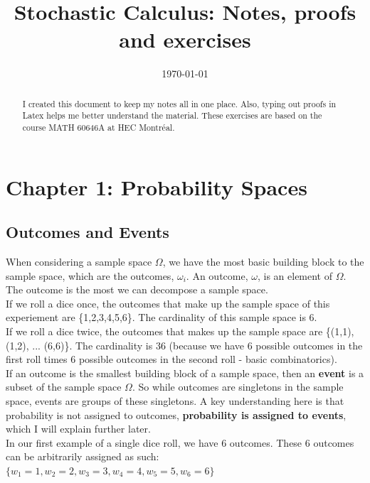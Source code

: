 \documentclass[11pt]{article}
\title{Stochastic Calculus: Notes, proofs and exercises}
\date{\today}
\begin{document}
\maketitle

\begin{abstract}
I created this document to keep my notes all in one place. Also, typing out proofs in Latex helps me better understand the material. These exercises are based on the course MATH 60646A at HEC Montréal.
\end{abstract}

\section{Chapter 1: Probability Spaces}

\subsection{Outcomes and Events}

When considering a sample space $\Omega$, we have the most basic building block to the sample space, which are the outcomes, $\omega_i$. An outcome, $\omega$, is an element of $\Omega$. The outcome is the most we can decompose a sample space. \\

If we roll a dice once, the outcomes that make up the sample space of this experiement are \{1,2,3,4,5,6\}. The cardinality of this sample space is 6. \\


If we roll a dice twice, the outcomes that makes up the sample space are \{(1,1), (1,2), ... (6,6)\}. The cardinality is 36 (because we have 6 possible outcomes in the first roll times 6 possible outcomes in the second roll - basic combinatorics). \\

If an outcome is the smallest building block of a sample space, then an \textbf{event} is a subset of the sample space $\Omega$. So while outcomes are singletons in the sample space, events are groups of these singletons. A key understanding here is that probability is not assigned to outcomes, \textbf{probability is assigned to events}, which I will explain further later.\\

In our first example of a single dice roll, we have 6 outcomes. These 6 outcomes can be arbitrarily assigned as such: $ \{ w_1 = 1, w_2 = 2, w_3 = 3, w_4 = 4, w_5 = 5, w_6 = 6 \}$
\end{document}
